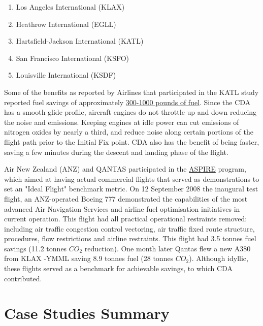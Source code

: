 \documentclass{aer1315-pretty}
\begin{document}
\begin{enumerate}
\itemsep-0.5em
\item Los Angeles International (KLAX)
\item Heathrow International (EGLL)
\item Hartsfield-Jackson International (KATL)
\item San Francisco International (KSFO)
\item Louisville International (KSDF)
\end{enumerate}
\vspace{-2.4mm}
Some of the benefits as reported by Airlines that participated in the KATL study reported fuel savings of approximately \href{http://www.gtresearchnews.gatech.edu/continuous-descent/}{300-1000 pounds of fuel}. Since the CDA has a smooth glide profile, aircraft engines do not throttle up and down reducing the noise and emissions. Keeping engines at idle power can cut emissions of nitrogen oxides by nearly a third, and reduce noise along certain portions of the flight path prior to the Initial Fix point. CDA also has the benefit of being faster, saving a few minutes during the descent and landing phase of the flight.\par

Air New Zealand (ANZ) and QANTAS participated in the \href{http://www.airways.co.nz/documents/Aspire-Annual-Report.pdf} {ASPIRE} program, which aimed at having actual commercial flights that served as demonstrations  to set an "Ideal Flight" benchmark metric. On 12 September 2008 the inaugural test flight, an ANZ-operated Boeing 777 demonstrated the capabilities of the most advanced Air Navigation Services and airline fuel optimisation initiatives in current operation. This flight had all practical operational restraints removed: including air traffic congestion control vectoring, air traffic fixed route structure, procedures, flow restrictions and airline restraints. This flight had 3.5 tonnes fuel savings (11.2 tonnes $CO_2$ reduction). One month later Qantas flew a new A380 from KLAX -YMML saving 8.9 tonnes fuel (28 tonnes $CO_2$). Although idyllic, these flights served as a benchmark for achievable savings, to which CDA contributed. \par

\section{Case Studies Summary}  \label{sec:case studies}
\end{document}
